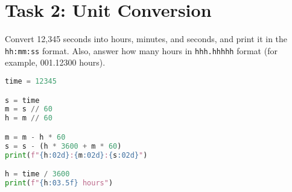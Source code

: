 \documentclass[11pt]{article}
\begin{document}
\section*{Task 2: Unit Conversion}
Convert 12,345 seconds into hours, minutes, and seconds, and print it in the \texttt{hh:mm:ss} format. Also, answer how many hours in \texttt{hhh.hhhhh} format (for example, 001.12300 hours).
\begin{lstlisting}[language=Python]
time = 12345

s = time
m = s // 60
h = m // 60

m = m - h * 60
s = s - (h * 3600 + m * 60)
print(f"{h:02d}:{m:02d}:{s:02d}")

h = time / 3600
print(f"{h:03.5f} hours")

\end{lstlisting}    
\end{document}
